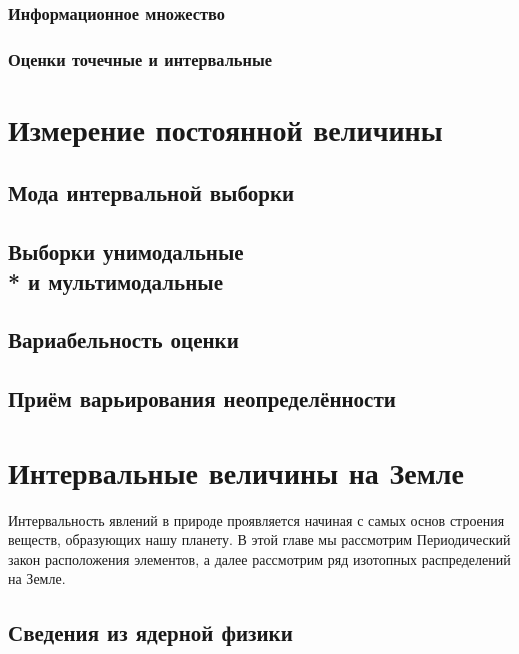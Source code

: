 \documentclass[a5paper,openany]{book}
\begin{document}
\subsection{Информационное множество} 
\label{InfoSetSect}

\subsection{Оценки точечные и интервальные} 

\chapter{Измерение постоянной величины} 
\label{MeasrConstChap}

\section{Мода интервальной выборки} 
\label{ModeSampleSect} 

\section[Выборки унимодальные и мультимодальные]%
{Выборки унимодальные \\* и мультимодальные} 
\label{UniMultiModSect} 

\section{Вариабельность оценки} 
\label{ConstVariabSect}  

\section{Приём варьирования неопределённости} 
\label{UncertAlterSect} 


\chapter{Интервальные величины на Земле}\label{s:IntNature}

Интервальность явлений в природе проявляется начиная с самых основ строения веществ, образующих нашу планету. В этой главе мы рассмотрим Периодический закон расположения элементов, а далее рассмотрим ряд изотопных распределений на Земле.


\section{Сведения из ядерной физики}\label{s:NuclPhys} 
\end{document}
